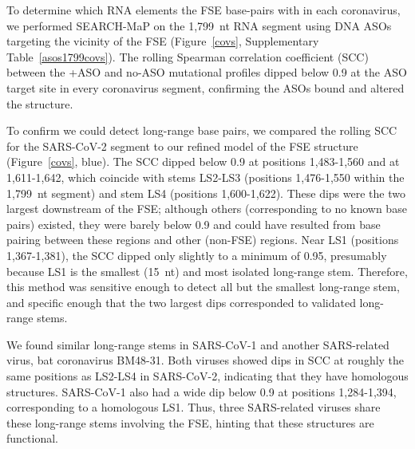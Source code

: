 \documentclass[main.tex]{subfiles}
\begin{document}
To determine which RNA elements the FSE base-pairs with in each coronavirus, we performed SEARCH-MaP on the 1,799~nt RNA segment using DNA ASOs targeting the vicinity of the FSE (Figure~\ref{covs}, Supplementary Table~\ref{asos1799covs}).
The rolling Spearman correlation coefficient (SCC) between the +ASO and no-ASO mutational profiles dipped below 0.9 at the ASO target site in every coronavirus segment, confirming the ASOs bound and altered the structure.

To confirm we could detect long-range base pairs, we compared the rolling SCC for the SARS-CoV-2 segment to our refined model of the FSE structure (Figure~\ref{covs}, blue).
The SCC dipped below 0.9 at positions 1,483-1,560 and at 1,611-1,642, which coincide with stems LS2-LS3 (positions 1,476-1,550 within the 1,799~nt segment) and stem LS4 (positions 1,600-1,622).
These dips were the two largest downstream of the FSE; although others (corresponding to no known base pairs) existed, they were barely below 0.9 and could have resulted from base pairing between these regions and other (non-FSE) regions.
Near LS1 (positions 1,367-1,381), the SCC dipped only slightly to a minimum of 0.95, presumably because LS1 is the smallest (15~nt) and most isolated long-range stem.
Therefore, this method was sensitive enough to detect all but the smallest long-range stem, and specific enough that the two largest dips corresponded to validated long-range stems.

We found similar long-range stems in SARS-CoV-1 and another SARS-related virus, bat coronavirus BM48-31.
Both viruses showed dips in SCC at roughly the same positions as LS2-LS4 in SARS-CoV-2, indicating that they have homologous structures.
SARS-CoV-1 also had a wide dip below 0.9 at positions 1,284-1,394, corresponding to a homologous LS1.
Thus, three SARS-related viruses share these long-range stems involving the FSE, hinting that these structures are functional.
\end{document}
